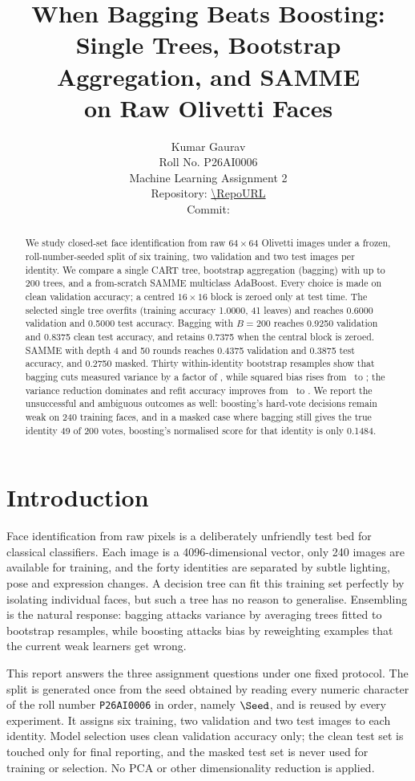 \documentclass[10pt,twocolumn,letterpaper]{article}
\title{When Bagging Beats Boosting:\\
Single Trees, Bootstrap Aggregation, and SAMME\\ on Raw Olivetti Faces}
\author{Kumar Gaurav\\
Roll No. P26AI0006\\
Machine Learning Assignment 2\\
\small Repository: \url{\RepoURL}\\
\small Commit: \texttt{\CommitHash}}
\begin{document}
\maketitle

\begin{abstract}
We study closed-set face identification from raw $64\times64$ Olivetti images
under a frozen, roll-number-seeded split of six training, two validation and two
test images per identity.  We compare a single CART tree, bootstrap aggregation
(bagging) with up to 200 trees, and a from-scratch SAMME multiclass AdaBoost.
Every choice is made on clean validation accuracy; a centred $16\times16$ block
is zeroed only at test time.  The selected single tree overfits (training
accuracy 1.0000, 41 leaves) and reaches 0.6000 validation and 0.5000 test
accuracy.  Bagging with $B=200$ reaches 0.9250 validation and 0.8375 clean test
accuracy, and retains 0.7375 when the central block is zeroed.  SAMME with depth
4 and 50 rounds reaches 0.4375 validation and 0.3875 test accuracy, and 0.2750
masked.  Thirty within-identity bootstrap resamples show that bagging cuts measured
variance by a factor of \BagVarRatio, while squared bias rises from
\TreeFinalBias~to \BagFinalBias; the variance reduction dominates and refit
accuracy improves from \TreeRefitAcc~to \BagRefitAcc.  We report the unsuccessful
and ambiguous outcomes as well: boosting's hard-vote decisions remain weak on
240 training faces, and in a masked case where bagging still gives the true
identity 49 of 200 votes, boosting's normalised score for that identity is only
0.1484.
\end{abstract}

\section{Introduction}

Face identification from raw pixels is a deliberately unfriendly test bed for
classical classifiers.  Each image is a 4096-dimensional vector, only 240
images are available for training, and the forty identities are separated by
subtle lighting, pose and expression changes.  A decision tree can fit this
training set perfectly by isolating individual faces, but such a tree has no
reason to generalise.  Ensembling is the natural response: bagging attacks
variance by averaging trees fitted to bootstrap resamples, while boosting
attacks bias by reweighting examples that the current weak learners get wrong.

This report answers the three assignment questions under one fixed protocol.
The split is generated once from the seed obtained by reading every numeric
character of the roll number \texttt{P26AI0006} in order, namely $\Seed$, and is
reused by every experiment.  It assigns six training, two validation and two
test images to each identity.  Model selection uses clean validation accuracy
only; the clean test set is touched only for final reporting, and the masked
test set is never used for training or selection.  No PCA or other
dimensionality reduction is applied.
\end{document}
